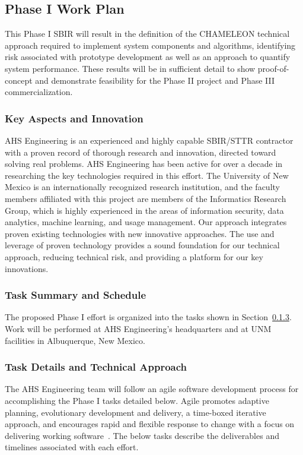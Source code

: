\documentclass{sbir}
\begin{document}
\subsection{Phase I Work Plan}
{This Phase I SBIR will result in the definition of the CHAMELEON technical approach required to implement system components and algorithms, identifying risk associated with prototype development as well as an approach to quantify system performance.  These results will be in sufficient detail to show proof-of-concept and demonstrate feasibility for the Phase II project and Phase III commercialization.}

\subsubsection{Key Aspects and Innovation}
AHS Engineering is an experienced and highly capable SBIR/STTR contractor with a proven record of thorough research and innovation, directed toward solving real problems. AHS Engineering has been active for over a decade in researching the key technologies required in this effort. The University of New Mexico is an internationally recognized research institution, and the faculty members affiliated with this project are members of the Informatics Research Group, which is highly experienced in the areas of information security, data analytics, machine learning, and usage management. Our approach integrates proven existing technologies with new innovative approaches. The use and leverage of proven technology provides a sound foundation for our technical approach, reducing technical risk, and providing a platform for our key innovations.

\subsubsection{Task Summary and Schedule}
The proposed Phase I effort is organized into the tasks shown in Section~\ref{sec:tasks}.  Work will be performed at AHS Engineering's headquarters and at UNM facilities in Albuquerque, New Mexico.

\subsubsection{Task Details and Technical Approach}\label{sec:tasks}
The AHS Engineering team will follow an agile software development process for accomplishing the Phase I tasks detailed below. Agile promotes adaptive planning, evolutionary development and delivery, a time-boxed iterative approach, and encourages rapid and flexible response to change with a focus on delivering working software~\cite{La:03}. The below tasks describe the deliverables and timelines associated with each effort.
\end{document}
